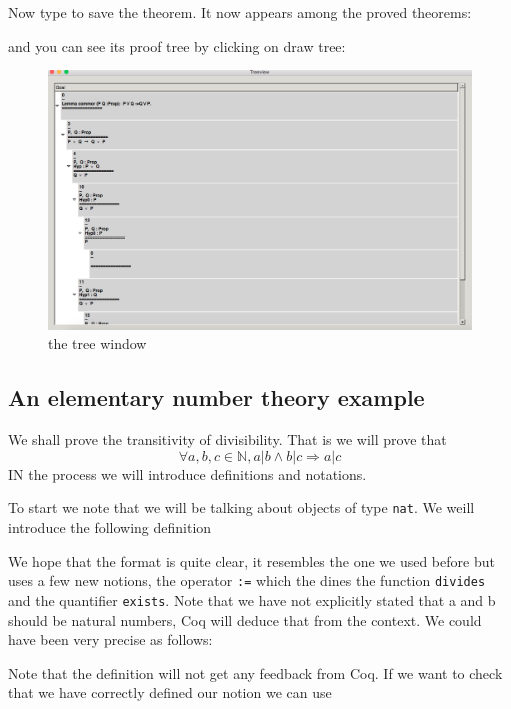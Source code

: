 Now type
to save the theorem. It now appears among the proved theorems:

and you can see its proof tree by clicking on draw tree:


\begin{figure}[h!]
\includegraphics[scale=0.3]{Installation/treecommor.png}
\caption{the tree window}\label{treesearch}
\end{figure}

\subsection{An elementary number theory example}
We shall prove the transitivity of divisibility. That is we will prove that
$$\forall a,b, c \in \mathbb{N},  a |b \land b | c \Rightarrow a | c$$IN the process we will introduce definitions and notations.

To start we note that we will be talking about objects of type \texttt{nat}. We weill introduce the following definition


We hope that the format is quite clear, it resembles the one we used before but uses a few new notions, the operator \texttt{:=}
 which the dines the function \texttt{divides} and the quantifier \texttt{exists}. Note that we have not explicitly stated that a and b should be natural numbers, Coq will deduce that from the context. We could have been very precise as follows:

Note that the definition will not get any feedback from Coq. If we want to check that we have correctly defined our notion we can use

